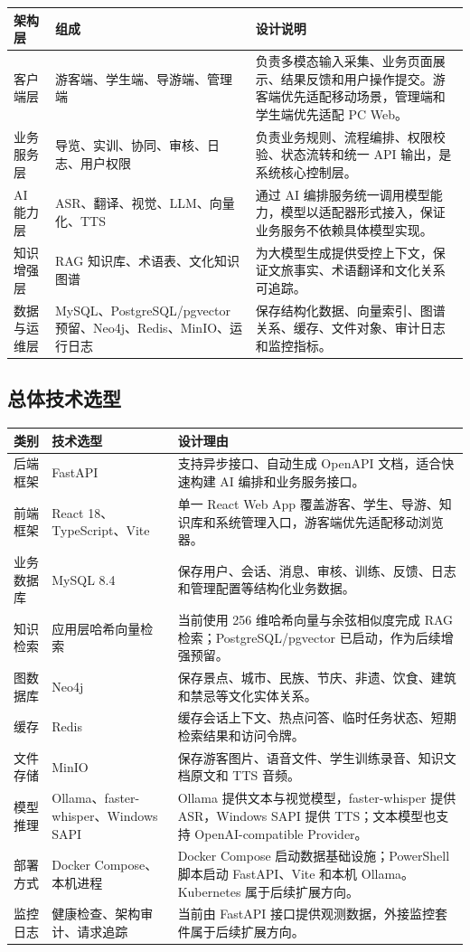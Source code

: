 \newpage
\begin{longtable}{p{2.7cm}p{4.1cm}p{6.2cm}}
\toprule
架构层 & 组成 & 设计说明 \\
\midrule
客户端层 & 游客端、学生端、导游端、管理端 & 负责多模态输入采集、业务页面展示、结果反馈和用户操作提交。游客端优先适配移动场景，管理端和学生端优先适配 PC Web。 \\
业务服务层 & 导览、实训、协同、审核、日志、用户权限 & 负责业务规则、流程编排、权限校验、状态流转和统一 API 输出，是系统核心控制层。 \\
AI 能力层 & ASR、翻译、视觉、LLM、向量化、TTS & 通过 AI 编排服务统一调用模型能力，模型以适配器形式接入，保证业务服务不依赖具体模型实现。 \\
知识增强层 & RAG 知识库、术语表、文化知识图谱 & 为大模型生成提供受控上下文，保证文旅事实、术语翻译和文化关系可追踪。 \\
数据与运维层 & MySQL、PostgreSQL/pgvector 预留、Neo4j、Redis、MinIO、运行日志 & 保存结构化数据、向量索引、图谱关系、缓存、文件对象、审计日志和监控指标。 \\
\bottomrule
\end{longtable}

\subsection{总体技术选型}

\begin{longtable}{p{2.6cm}p{3.8cm}p{6.6cm}}
\toprule
类别 & 技术选型 & 设计理由 \\
\midrule
后端框架 & FastAPI & 支持异步接口、自动生成 OpenAPI 文档，适合快速构建 AI 编排和业务服务接口。 \\
前端框架 & React 18、TypeScript、Vite & 单一 React Web App 覆盖游客、学生、导游、知识库和系统管理入口，游客端优先适配移动浏览器。 \\
业务数据库 & MySQL 8.4 & 保存用户、会话、消息、审核、训练、反馈、日志和管理配置等结构化业务数据。 \\
知识检索 & 应用层哈希向量检索 & 当前使用 256 维哈希向量与余弦相似度完成 RAG 检索；PostgreSQL/pgvector 已启动，作为后续增强预留。 \\
图数据库 & Neo4j & 保存景点、城市、民族、节庆、非遗、饮食、建筑和禁忌等文化实体关系。 \\
缓存 & Redis & 缓存会话上下文、热点问答、临时任务状态、短期检索结果和访问令牌。 \\
文件存储 & MinIO & 保存游客图片、语音文件、学生训练录音、知识文档原文和 TTS 音频。 \\
模型推理 & Ollama、faster-whisper、Windows SAPI & Ollama 提供文本与视觉模型，faster-whisper 提供 ASR，Windows SAPI 提供 TTS；文本模型也支持 OpenAI-compatible Provider。 \\
部署方式 & Docker Compose、本机进程 & Docker Compose 启动数据基础设施；PowerShell 脚本启动 FastAPI、Vite 和本机 Ollama。Kubernetes 属于后续扩展方向。 \\
监控日志 & 健康检查、架构审计、请求追踪 & 当前由 FastAPI 接口提供观测数据，外接监控套件属于后续扩展方向。 \\
\bottomrule
\end{longtable}

